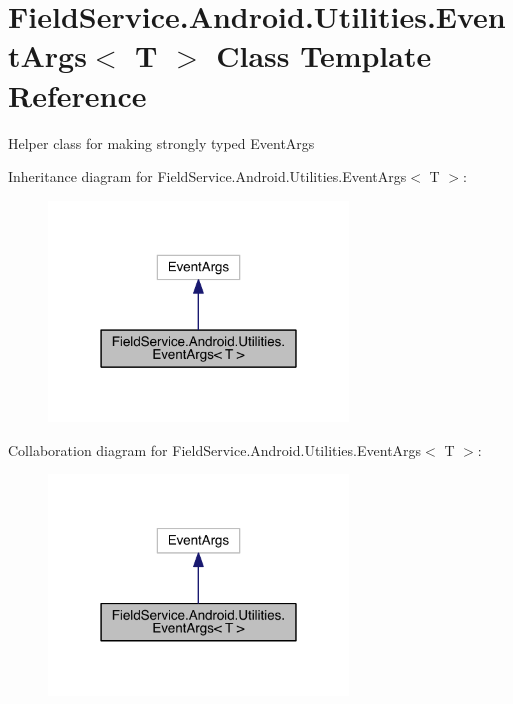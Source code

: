 \hypertarget{class_field_service_1_1_android_1_1_utilities_1_1_event_args_3_01_t_01_4}{\section{Field\+Service.\+Android.\+Utilities.\+Event\+Args$<$ T $>$ Class Template Reference}
\label{class_field_service_1_1_android_1_1_utilities_1_1_event_args_3_01_t_01_4}
}


Helper class for making strongly typed Event\+Args  




Inheritance diagram for Field\+Service.\+Android.\+Utilities.\+Event\+Args$<$ T $>$\+:
\nopagebreak
\begin{figure}[H]
\begin{center}
\leavevmode
\includegraphics[width=226pt]{class_field_service_1_1_android_1_1_utilities_1_1_event_args_3_01_t_01_4__inherit__graph}
\end{center}
\end{figure}


Collaboration diagram for Field\+Service.\+Android.\+Utilities.\+Event\+Args$<$ T $>$\+:
\nopagebreak
\begin{figure}[H]
\begin{center}
\leavevmode
\includegraphics[width=226pt]{class_field_service_1_1_android_1_1_utilities_1_1_event_args_3_01_t_01_4__coll__graph}
\end{center}
\end{figure}
